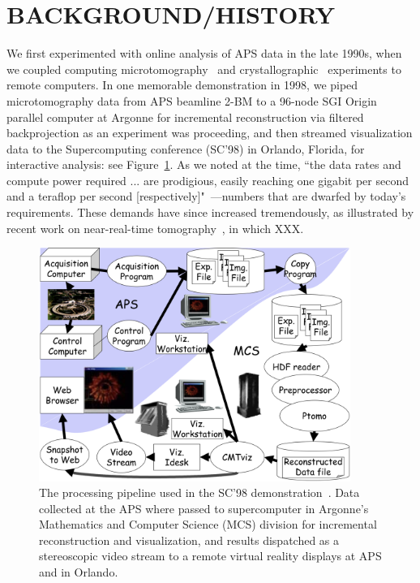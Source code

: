\documentclass{aip-cp}
\newcommand\kyle[1]{}
\newcommand\kyle[1]{{\color{purple}[Kyle: #1]}}
\begin{document}
\kyle{References:networking materials data~\cite{foster2015networking}, Justin~\cite{wozniak2015big}, APS~\cite{toby2015practices}}


\section{BACKGROUND/HISTORY}

We first experimented with online analysis of APS data in the late 1990s, 
when we coupled 
computing microtomography~\cite{wang1999quasi,wang2001high} and crystallographic~\cite{von2000using}
experiments to remote computers.
In one memorable demonstration in 1998, we piped microtomography data from APS beamline 2-BM to a 
96-node SGI Origin parallel computer 
at Argonne for incremental reconstruction via filtered backprojection as an experiment was 
proceeding,
and then streamed visualization data to the Supercomputing conference (SC'98) in Orlando, Florida, 
for interactive analysis: see Figure~\ref{fig:sc98}. 
As we noted at the time, 
``the data rates and compute power required ... are prodigious, easily reaching one gigabit per 
second and a teraflop per second [respectively]"~\cite{von2000real}---numbers that are dwarfed by 
today's requirements. 
These demands have since increased tremendously, as illustrated by recent work on near-real-time tomography~\cite{Bicer_Europar15,bicer2017real},
in which XXX.

\begin{figure}[h]
  \centerline{\includegraphics[width=4in]{Figs/APS-Fig.png}}
  \caption{The processing pipeline used in the SC'98 demonstration~\cite{von2000real}. Data 
collected at the APS 
  where passed to supercomputer in Argonne's Mathematics and Computer Science (MCS) division for
  incremental reconstruction and visualization, and results dispatched as a stereoscopic
  video stream to a remote virtual reality displays at APS and in Orlando.\label{fig:sc98}}
\end{figure}
\end{document}
